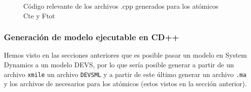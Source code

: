 \begin{figure}[!h]
\centering     %
{}
\caption{Código relevante de los archivos .cpp generados para los atómicos Cte y Ftot}
\end{figure}

\subsubsection{Generación de modelo ejecutable en CD++}
Hemos visto en las secciones anteriores que es posible pasar un modelo en System Dynamics a un modelo DEVS, por lo que sería posible generar a partir de un archivo \texttt{xmile} un archivo \texttt{DEVSML} y a partir de este último generar un archivo \texttt{.ma} y los archivos de necesarios para los atómicos (estos vistos en la sección anterior).


